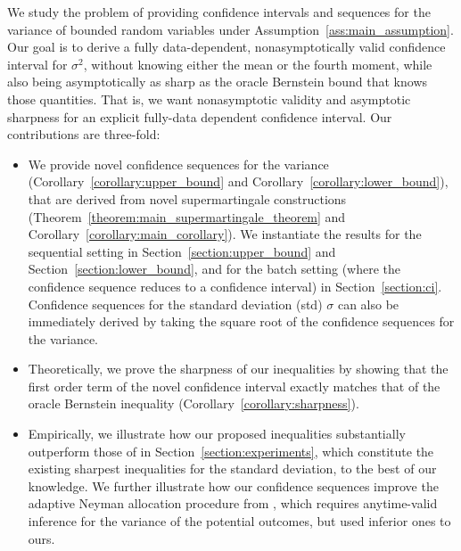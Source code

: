 We study the problem of providing confidence intervals and sequences for the variance of bounded random variables under Assumption~\ref{ass:main_assumption}. Our goal is to derive a fully data-dependent, nonasymptotically valid confidence interval for $\sigma^2$, without knowing either the mean or the fourth moment, while also being asymptotically as sharp as the oracle Bernstein bound that knows those quantities. That is, we want nonasymptotic validity and asymptotic sharpness for an explicit fully-data dependent confidence interval.
Our contributions are three-fold:
\begin{itemize}
    \item We provide novel confidence sequences for the variance (Corollary~\ref{corollary:upper_bound} and Corollary~\ref{corollary:lower_bound}), that are derived from novel supermartingale constructions (Theorem~\ref{theorem:main_supermartingale_theorem} and Corollary~\ref{corollary:main_corollary}). We instantiate the results for the sequential setting in Section~\ref{section:upper_bound} and Section~\ref{section:lower_bound}, and for the batch setting (where the confidence sequence reduces to a confidence interval) in Section~\ref{section:ci}. Confidence sequences for the standard deviation (std) $\sigma$ can also be immediately derived by taking the square root of the confidence sequences for the variance.
    \item Theoretically, we prove the sharpness of our inequalities by showing that the first order term of the novel confidence interval exactly matches that of the oracle Bernstein inequality (Corollary~\ref{corollary:sharpness}).
    \item Empirically, we illustrate how our proposed inequalities substantially outperform those of \citet[Theorem 10]{maurer2009empirical} in Section~\ref{section:experiments}, which constitute the existing sharpest inequalities for the standard deviation, to the best of our knowledge. We further illustrate how our confidence sequences improve the adaptive Neyman allocation procedure from \citet{neopane2025optimistic}, which requires anytime-valid inference for the variance of the potential outcomes, but used inferior ones to ours.
\end{itemize}
  





